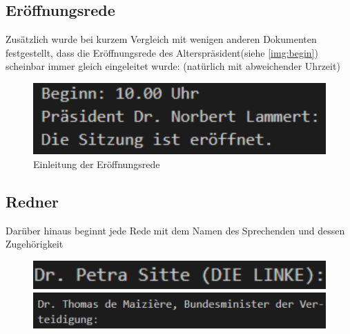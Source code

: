 \subsection{Eröffnungsrede}
\label{subsec:openning}
Zusätzlich wurde bei kurzem Vergleich mit wenigen anderen Dokumenten festgestellt, dass die Eröffnungsrede des Alterspräsident(siehe \autoref{img:begin}) scheinbar immer gleich eingeleitet wurde:  (natürlich mit abweichender Uhrzeit)
\begin{figure}[h]
	\centering
	\includegraphics[width=.7\linewidth]{img/begin.pdf}
	\caption{Einleitung der Eröffnungsrede}
	\label{img:begin}
\end{figure}
\subsection{Redner}
\label{subsec:speech}
Darüber hinaus beginnt jede Rede mit dem Namen des Sprechenden und dessen Zugehörigkeit
\begin{figure}[h]
	\begin{minipage}{.42\linewidth}
		\includegraphics[width=\linewidth]{img/petra.pdf}
	\end{minipage}\hfill
	\begin{minipage}{.54\linewidth}
		\includegraphics[width=\linewidth]{img/thomas.pdf}
	\end{minipage}
\end{figure}

